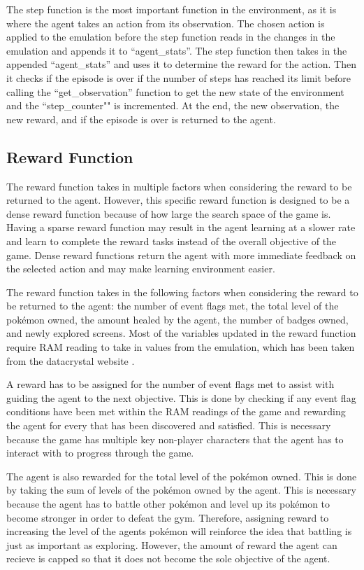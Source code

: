 The step function is the most important function in the environment, as it is where the agent takes an action from its observation. The chosen action is applied to the emulation before the step function reads in the changes in the emulation and appends it to ``agent\_stats''. The step function then takes in the appended ``agent\_stats'' and uses it to determine the reward for the action. Then it checks if the episode is over if the number of steps has reached its limit before calling the ``get\_observation'' function to get the new state of the environment and the ``step\_counter"" is incremented. At the end, the new observation, the new reward, and if the episode is over is returned to the agent.

\subsection{Reward Function}

The reward function takes in multiple factors when considering the reward to be returned to the agent. However, this specific reward function is designed to be a dense reward function because of how large the search space of the game is. Having a sparse reward function may result in the agent learning at a slower rate and learn to complete the reward tasks instead of the overall objective of the game. Dense reward functions return the agent with more immediate feedback on the selected action and may make learning environment easier. 

The reward function takes in the following factors when considering the reward to be returned to the agent: the number of event flags met, the total level of the pokémon owned, the amount healed by the agent, the number of badges owned, and newly explored screens. Most of the variables updated in the reward function require RAM reading to take in values from the emulation, which has been taken from the datacrystal website \cite{datacrystal}.

A reward has to be assigned for the number of event flags met to assist with guiding the agent to the next objective. This is done by checking if any event flag conditions have been met within the RAM readings of the game and rewarding the agent for every that has been discovered and satisfied. This is necessary because the game has multiple key non-player characters that the agent has to interact with to progress through the game. 

The agent is also rewarded for the total level of the pokémon owned. This is done by taking the sum of levels of the pokémon owned by the agent. This is necessary because the agent has to battle other pokémon and level up its pokémon to become stronger in order to defeat the gym. Therefore, assigning reward to increasing the level of the agents pokémon will reinforce the idea that battling is just as important as exploring. However, the amount of reward the agent can recieve is capped so that it does not become the sole objective of the agent. 

